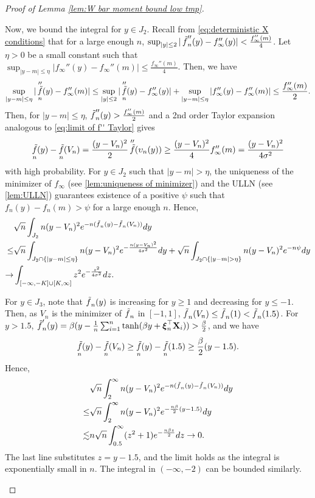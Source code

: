 \documentclass[preprint,reqno]{imsart}
\DeclareMathOperator{\ft}{\tilde{\mathnormal f}}
\newcommand{\X}{\mathbf{X}}
\newcommand{\xxi}{\boldsymbol \xi}
\DeclareMathOperator{\sumin}{\sum_{\mathnormal i=1}^{\mathnormal n}}
\begin{document}
\begin{appendix}
\begin{proof}[Proof of Lemma \ref{lem:W bar moment bound low tmp}]
\begin{enumerate}[(a)]
    Now, we bound the integral for $y \in J_2$. Recall from \eqref{eq:deterministic X conditions} that for a large enough $n$, $\sup_{|y| \le 2} |\ft_n''(y) - f_{\infty}''(y)| < \frac{f_{\infty}''(m)}{4}$. Let $\eta > 0$ be a small constant such that $\sup_{|y - m| \le \eta} |f_{\infty}''(y) - f_{\infty}''(m)| \le \frac{f_{\infty}''(m)}{4}$. Then, we have
    \begin{align*}
        \sup_{|y - m| \le \eta} |\ft_n''(y) - f_{\infty}''(m)| \le \sup_{|y| \le 2} |\ft_n''(y) - f_{\infty}''(y)| + \sup_{|y - m| \le \eta} |f_{\infty}''(y) - f_{\infty}''(m)| \le \frac{f_{\infty}''(m)}{2}.
    \end{align*}
    Then, for $|y - m| \le \eta$, $\ft_n''(y) > \frac{f_{\infty}''(m)}{2}$ and a 2nd order Taylor expansion analogous to \eqref{eq:limit of f'' Taylor} gives
    $$\ft_n(y) - \ft_n(V_n) = \frac{(y-V_n)^2}{2} \ft''(\upsilon_n(y)) \ge \frac{(y-V_n)^2}{4} {f_{\infty}''(m)} = \frac{(y-V_n)^2 }{4 \sigma^2} $$
    with high probability.
    For $y \in J_2$ such that $|y - m| > \eta$, the uniqueness of the minimizer of $f_{\infty}$ (see \cref{lem:uniqueness of minimizer}) and the ULLN (see \cref{lem:ULLN}) guarantees existence of a positive $\psi$ such that $f_{n}(y) - f_{n}(m) > \psi$ for a large enough $n$.
    Hence, 
    \begin{align}
        &\sqrt{n} \int_{J_2} n(y - V_n)^2 e^{-n(\ft_n(y) - \ft_n(V_n))} dy \notag \\
        \le & \sqrt{n} \int_{{J_2 \cap \{|y-m| \le \eta\} }} n(y - V_n)^2 e^{-\frac{n (y - V_n)^2}{4\sigma^2}} dy + \sqrt{n} \int_{{J_2 \cap \{|y-m| > \eta\} }} n(y - V_n)^2 e^{- n \psi} dy \label{eq:integral J_2} \\ 
        \to & \int_{[-\infty, -K] \cup [K, \infty]} z^2 e^{-\frac{z^2}{4\sigma^2}} dz. \notag
    \end{align}
    
    For $y \in J_3$, note that $\ft_n(y)$ is increasing for $y \ge 1$ and decreasing for $y \le -1$. Then, as $V_n$ is the minimizer of $\ft_n$ in $[-1,1]$, $\ft_n(V_n) \le \ft_n(1) < \ft_n(1.5)$. For $y > 1.5$, $\ft_n'(y) = \beta (y - \frac{1}{n} \sumin \tanh(\beta y + \xxi_n^\top \X_i)) > \frac{\beta}{2}$, and we have
    $$\ft_n(y) - \ft_n(V_n) \ge \ft_n(y) - \ft_n(1.5)  \ge \frac{\beta}{2} (y-1.5).$$
    Hence,
    \begin{align}
        &\sqrt{n} \int_{2}^{\infty} n(y - V_n)^2 e^{-n(\ft_n(y) - \ft_n(V_n))} dy \notag \\
        \le & \sqrt{n} \int_{2}^{\infty} n(y - V_n)^2 e^{-\frac{n\beta}{2} (y-1.5)} dy \label{eq:integral J_3} \\
        \lesssim& n \sqrt{n} \int_{0.5}^{\infty} (z^2 +1) e^{-\frac{n\beta z}{2}} dz \to 0. \notag
    \end{align}
    The last line substitutes $z = y-1.5$, and the limit holds as the integral is exponentially small in $n$. The integral in $(-\infty, -2)$ can be bounded similarly.


\end{enumerate}
\end{proof}
\end{appendix}
\end{document}
